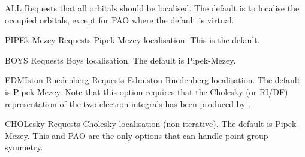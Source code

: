 \begin{keywordlist}
\item[ALL ]
Requests that all orbitals should be localised. The default is
to localise the occupied orbitals, except for PAO where the default is
virtual.
%
%
%
\item[PIPEk-Mezey]
Requests Pipek-Mezey localisation. This is the default.
\item[BOYS]
Requests Boys localisation. The default is Pipek-Mezey.
\item[EDMIston-Ruedenberg]
Requests Edmiston-Ruedenberg localisation. The default is Pipek-Mezey.
Note that this option requires that the Cholesky (or RI/DF) representation
of the two-electron integrals has been produced by .
\item[CHOLesky]
Requests Cholesky localisation (non-iterative). The default is Pipek-Mezey.
This and PAO are the only options that can handle point group symmetry.

\end{keywordlist}
